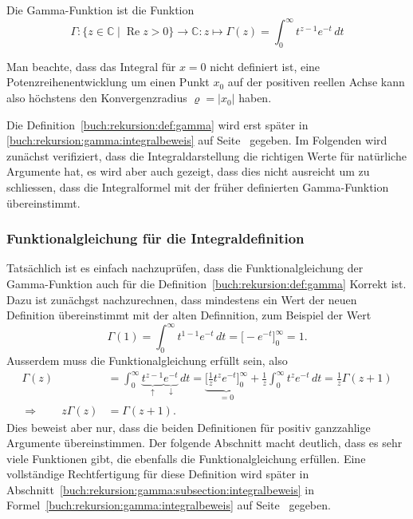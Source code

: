 \begin{definition}
\label{buch:rekursion:def:gamma}
Die Gamma-Funktion ist die Funktion 
\[
\Gamma
\colon
\{z\in\mathbb{C} \mid \operatorname{Re}z>0\}
\to \mathbb{C}
:
z
\mapsto
\Gamma(z) = \int_0^\infty t^{z-1}e^{-t}\,dt
\]
%
%
\end{definition}

Man beachte, dass das Integral für $x=0$ nicht definiert ist, eine
Potenzreihenentwicklung um einen Punkt $x_0$ auf der positiven reellen
Achse kann also höchstens den Konvergenzradius $\varrho=|x_0|$ haben.

Die Definition~\ref{buch:rekursion:def:gamma} wird erst später in
\eqref{buch:rekursion:gamma:integralbeweis} auf
Seite~\pageref{buch:rekursion:gamma:integralbeweis} gegeben.
Im Folgenden wird zunächst verifiziert, dass die Integraldarstellung
die richtigen Werte für natürliche Argumente hat, es wird aber auch
gezeigt, dass dies nicht ausreicht um zu schliessen, dass die
Integralformel mit der früher definierten Gamma-Funktion übereinstimmt.

%
%
\subsubsection{Funktionalgleichung für die Integraldefinition}
Tatsächlich ist es einfach nachzuprüfen, dass die Funktionalgleichung
der Gamma-Funktion auch für die Definition~\ref{buch:rekursion:def:gamma}
Korrekt ist. 
Dazu ist zunächgst nachzurechnen, dass mindestens ein Wert der neuen 
Definition übereinstimmt mit der alten Definnition, zum Beispiel der
Wert
\[
\Gamma(1)
=
\int_0^\infty t^{1-1}e^{-t}\,dt
=
\biggl[ -e^{-t} \biggr]_0^\infty
=
1.
\]
Ausserdem muss die Funktionalgleichung erfüllt sein, also
\begin{align*}
\Gamma(z)
&=
\int_0^\infty
\underbrace{t^{z-1}}_{\displaystyle\uparrow}
\underbrace{e^{-t}}_{\displaystyle\downarrow}
\,dt
=
\underbrace{\biggl[
\frac{1}{z} t^z e^{-t}
\biggr]_0^\infty}_{\displaystyle=0}
+
\frac{1}{z}
\int_0^\infty
t^z e^{-t}
\,dt
=
\frac{1}{z}\Gamma(z+1)
\\
\Rightarrow\qquad
z\Gamma(z)&=\Gamma(z+1).
\end{align*}
Dies beweist aber nur, dass die beiden Definitionen für positiv
ganzzahlige Argumente übereinstimmen.
Der folgende Abschnitt macht deutlich, dass es sehr viele Funktionen gibt,
die ebenfalls die Funktionalgleichung erfüllen.
Eine vollständige Rechtfertigung für diese Definition wird später
in Abschnitt~\ref{buch:rekursion:gamma:subsection:integralbeweis}
in Formel~\eqref{buch:rekursion:gamma:integralbeweis}
auf Seite~\pageref{buch:rekursion:gamma:integralbeweis}
gegeben.

